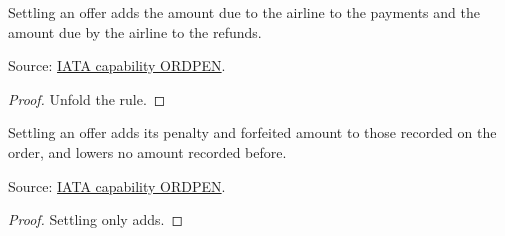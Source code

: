 \begin{theorem}
  \label{thm:change-cancellation-settle-payments}
  Settling an offer adds the amount due to the airline to the payments and the
  amount due by the airline to the refunds.

  Source: \href{https://retailing.iata.org/armi/docs/ORDPEN/}{IATA capability ORDPEN}.
\end{theorem}
\begin{proof}
  Unfold the rule.
\end{proof}

\begin{theorem}
  \label{thm:change-cancellation-settle-records}
  Settling an offer adds its penalty and forfeited amount to those recorded on
  the order, and lowers no amount recorded before.

  Source: \href{https://retailing.iata.org/armi/docs/ORDPEN/}{IATA capability ORDPEN}.
\end{theorem}
\begin{proof}
  Settling only adds.
\end{proof}

